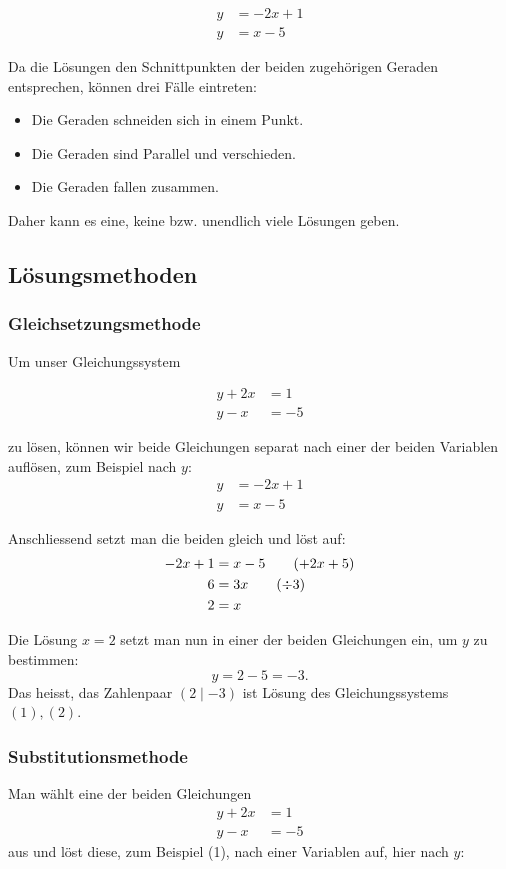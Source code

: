 \documentclass[%
11pt,%
twoside,%
titlepage,%
swissgerman,%
headsepline%
]{scrartcl}
\theoremstyle{definition}
\theoremstyle{plain}
\theoremstyle{plain}
\begin{document}
	\begin{align}
		y&=-2x+1\tag{$1'$}\\
		y&=x-5\tag{$2'$}
	\end{align}
	
	Da die Lösungen den Schnittpunkten der beiden zugehörigen Geraden entsprechen, können drei Fälle eintreten:
	
	\begin{itemize}
		\item Die Geraden schneiden sich in einem Punkt.
		\item Die Geraden sind Parallel und verschieden.
		\item Die Geraden fallen zusammen.
	\end{itemize}
	
	Daher kann es eine, keine bzw. unendlich viele Lösungen geben.
	
	\subsection{Lösungsmethoden}
	\subsubsection{Gleichsetzungsmethode}
	
	Um unser Gleichungssystem
	
	\begin{align}
		y+2x&=1\tag{1}\\
		y-x&=-5\tag{2}
	\end{align}
	
	zu lösen, können wir beide Gleichungen separat nach einer der beiden Variablen auflösen, zum Beispiel nach $y$:
	\begin{align}
		y&=-2x+1\tag{$1'$}\\
		y&=x-5\tag{$2'$}
	\end{align}
	
	Anschliessend setzt man die beiden gleich und löst auf:
	\begin{align}
		-2x+1&=x-5\tag{$+2x+5$}\\
		6&=3x\tag{$\div3$}\\
		2&=x\notag
	\end{align}
	
	Die Lösung $x=2$ setzt man nun in einer der beiden Gleichungen ein, um $y$ zu bestimmen:
	$$y=2-5=-3.$$
	Das heisst, das Zahlenpaar $(2\mid -3)$ ist Lösung des Gleichungssystems $(1), (2)$.
	
	\subsubsection{Substitutionsmethode}
	Man wählt eine der beiden Gleichungen
	\begin{align}
		y+2x&=1\tag{1}\\
		y-x&=-5\tag{2}
	\end{align}
	aus und löst diese, zum Beispiel (1), nach einer Variablen auf, hier nach $y$:
	
\end{document}
